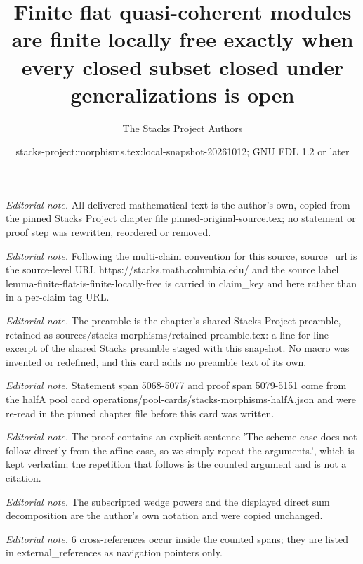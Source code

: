 \documentclass[10pt,a4paper]{amsart}
\title{Finite flat quasi-coherent modules are finite locally free exactly when every closed subset closed under generalizations is open}
\author{The Stacks Project Authors}
\date{stacks-project:morphisms.tex:local-snapshot-20261012; GNU FDL 1.2 or later}
\theoremstyle{plain}
\theoremstyle{definition}
\theoremstyle{remark}
\numberwithin{equation}{subsection}
\begin{document}
\maketitle
\noindent\textit{Editorial note.} All delivered mathematical text is the author's own, copied from the pinned Stacks Project chapter file pinned-original-source.tex; no statement or proof step was rewritten, reordered or removed.\par\medskip
\noindent\textit{Editorial note.} Following the multi-claim convention for this source, source\_url is the source-level URL https://stacks.math.columbia.edu/ and the source label lemma-finite-flat-is-finite-locally-free is carried in claim\_key and here rather than in a per-claim tag URL.\par\medskip
\noindent\textit{Editorial note.} The preamble is the chapter's shared Stacks Project preamble, retained as sources/stacks-morphisms/retained-preamble.tex: a line-for-line excerpt of the shared Stacks preamble staged with this snapshot. No macro was invented or redefined, and this card adds no preamble text of its own.\par\medskip
\noindent\textit{Editorial note.} Statement span 5068-5077 and proof span 5079-5151 come from the halfA pool card operations/pool-cards/stacks-morphisms-halfA.json and were re-read in the pinned chapter file before this card was written.\par\medskip
\noindent\textit{Editorial note.} The proof contains an explicit sentence 'The scheme case does not follow directly from the affine case, so we simply repeat the arguments.', which is kept verbatim; the repetition that follows is the counted argument and is not a citation.\par\medskip
\noindent\textit{Editorial note.} The subscripted wedge powers and the displayed direct sum decomposition are the author's own notation and were copied unchanged.\par\medskip
\noindent\textit{Editorial note.} 6 cross-references occur inside the counted spans; they are listed in external\_references as navigation pointers only.\par\medskip
\end{document}
